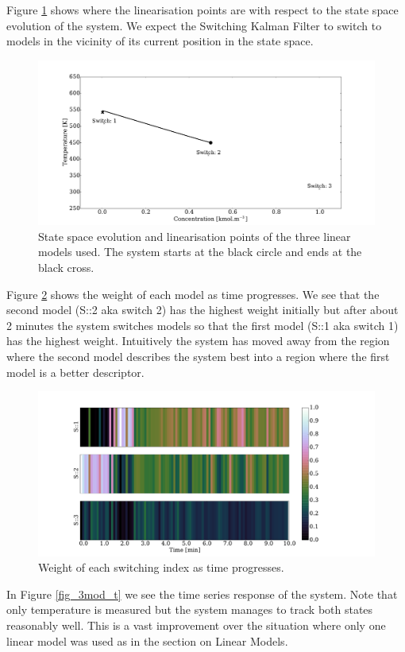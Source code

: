 \documentclass[../masters.tex]{subfiles}
\begin{document}
Figure \ref{fig_3mod_ss} shows where the linearisation points are with respect to the state space evolution of the system. We expect the Switching Kalman Filter to switch to models in the vicinity of its current position in the state space.
\begin{figure}[H] 
\centering
\includegraphics[scale=0.3]{skf_s3_s.pdf}
\caption{State space evolution and linearisation points of the three linear models used. The system starts at the black circle and ends at the black cross.}
\label{fig_3mod_ss}
\end{figure}
Figure \ref{fig_3mod_w} shows the weight of each model as time progresses. We see that the second model (S::2 aka switch 2) has the highest weight initially but after about 2 minutes the system switches models so that the first model (S::1 aka switch 1) has the highest weight. Intuitively the system has moved away from the region where the second model describes the system best into a region where the first model is a better descriptor. 
\begin{figure}[H] 
\centering
\includegraphics[scale=0.3]{skf_s3_w.pdf}
\caption{Weight of each switching index as time progresses.}
\label{fig_3mod_w}
\end{figure}
In Figure \ref{fig_3mod_t} we see the time series response of the system. Note that only temperature is measured but the system manages to track both states reasonably well. This is a vast improvement over the situation where only one linear model was used as in the section on Linear Models.
\end{document}
